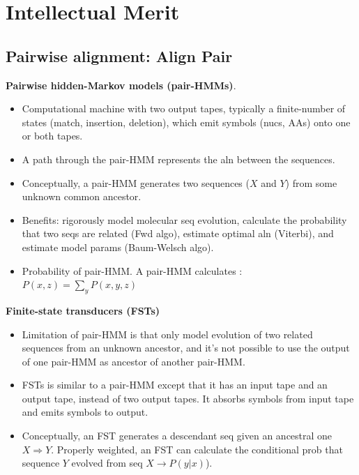 \section{Intellectual Merit}
\subsection{Pairwise alignment: Align Pair}

\textbf{Pairwise hidden-Markov models (pair-HMMs)}.
    \begin{itemize}
    \item Computational machine with two output tapes, typically
        a finite-number of states (match, insertion, deletion),
        which emit symbols (nucs, AAs) onto one or both tapes.
    \item A path through the pair-HMM represents the aln between
        the sequences.
    \item Conceptually, a pair-HMM generates two sequences ($X$
        and $Y$) from some unknown common ancestor.
    \item Benefits: rigorously model molecular seq evolution,
        calculate the probability that two seqs are related (Fwd
        algo), estimate optimal aln (Viterbi), and estimate model
        params (Baum-Welsch algo).
    \item Probability of pair-HMM.
        A pair-HMM calculates \parencite{yoon_2009_hmm}:\\
        $P(x,z) = \sum_y P(x,y,z)$
    \end{itemize}

\textbf{Finite-state transducers (FSTs)}
    \begin{itemize}
    \item Limitation of pair-HMM is that only model evolution of
        two related sequences from an unknown ancestor, and it's
        not possible to use the output of one pair-HMM as ancestor
        of another pair-HMM.
    \item FSTs is similar to a pair-HMM except that it has an input
        tape and an output tape, instead of two output tapes. It
        absorbs symbols from input tape and emits symbols to output.
    \item Conceptually, an FST generates a descendant seq given
        an ancestral one $X \Rightarrow Y$. Properly weighted,
        an FST can calculate the conditional prob that sequence
        $Y$ evolved from seq $X \rightarrow P(y|x)$).
    \end{itemize}

